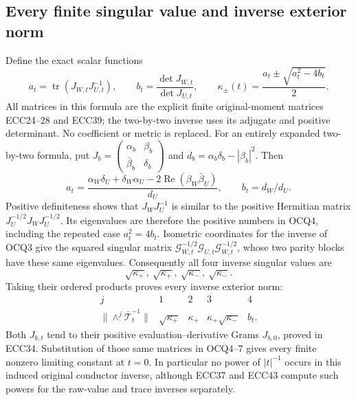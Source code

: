 \subsection{Every finite singular value and inverse exterior norm}
Define the exact scalar functions
\[
 a_t=\operatorname{tr}(J_{W,t}J_{U,t}^{-1}),\qquad
 b_t=\frac{\det J_{W,t}}{\det J_{U,t}},\qquad
 \kappa_\pm(t)=\frac{a_t\pm\sqrt{a_t^2-4b_t}}2.
 \tag{OCQ4}
\]
All matrices in this formula are the explicit finite original-moment
matrices ECC24--28 and ECC39; the two-by-two inverse uses its adjugate
and positive determinant. No coefficient or metric is replaced.
For an entirely expanded two-by-two formula, put
$J_b=\left(\begin{smallmatrix}\alpha_b&\beta_b\\
 \bar\beta_b&\delta_b\end{smallmatrix}\right)$ and
$d_b=\alpha_b\delta_b-|\beta_b|^2$. Then
\[
 a_t=\frac{\alpha_W\delta_U+\delta_W\alpha_U
                -2\operatorname{Re}(\beta_W\bar\beta_U)}{d_U},
 \qquad b_t=d_W/d_U.
 \tag{OCQ5}
\]
Positive definiteness shows that $J_WJ_U^{-1}$ is similar to the
positive Hermitian matrix $J_U^{-1/2}J_WJ_U^{-1/2}$.
Its eigenvalues are therefore the positive numbers in OCQ4, including
the repeated case $a_t^2=4b_t$. Isometric coordinates for the inverse
of OCQ3 give the squared singular matrix
$\mathcal G_{W,t}^{-1/2}\mathcal G_{U,t}
 \mathcal G_{W,t}^{-1/2}$, whose two parity blocks have these same
eigenvalues. Consequently all four inverse singular values are
\[
 \sqrt{\kappa_+},\ \sqrt{\kappa_+},\
 \sqrt{\kappa_-},\ \sqrt{\kappa_-}.
 \tag{OCQ6}
\]
Taking their ordered products proves every inverse exterior norm:
\[
 \begin{array}{c|cccc}
 j&1&2&3&4\\\hline
 \|\wedge^j\overline{\mathcal T}_t^{-1}\|&
 \sqrt{\kappa_+}&\kappa_+&\kappa_+\sqrt{\kappa_-}&b_t.
 \end{array}\tag{OCQ7}
\]
Both $J_{b,t}$ tend to their positive evaluation--derivative Grams
$J_{b,0}$, proved in ECC34. Substitution of those same matrices in
OCQ4--7 gives every finite nonzero limiting constant at $t=0$.
In particular no power of $|t|^{-1}$ occurs in this induced original
conductor inverse, although ECC37 and ECC43 compute such powers for
the raw-value and trace inverses separately.

